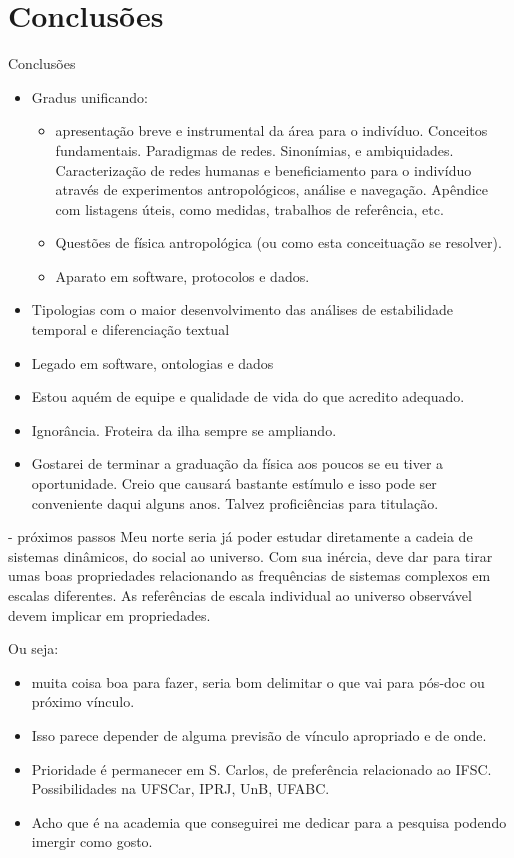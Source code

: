 \documentclass[10pt]{beamer}
\begin{document}
\section{Conclusões}
\begin{frame}{Conclusões}
\begin{itemize}
	\item Gradus unificando:
		\begin{itemize}
			\item  apresentação breve e instrumental da área para o indivíduo. Conceitos fundamentais. Paradigmas de redes. Sinonímias, e ambiquidades. Caracterização de redes humanas e beneficiamento para o indivíduo através de experimentos antropológicos, análise e navegação.
				Apêndice com listagens úteis, como medidas, trabalhos de referência, etc.
			\item Questões de física antropológica (ou como esta conceituação se resolver).
			\item Aparato em software, protocolos e dados.
		\end{itemize}
	\item Tipologias com o maior desenvolvimento das análises de estabilidade temporal e diferenciação textual
	\item Legado em software, ontologias e dados
	\item Estou aquém de equipe e qualidade de vida do que acredito adequado. 
	\item Ignorância. Froteira da ilha sempre se ampliando.
	\item Gostarei de terminar a graduação da física aos poucos se eu tiver a oportunidade. Creio que causará bastante estímulo e isso pode ser conveniente daqui alguns anos. Talvez proficiências para titulação.
\end{itemize}
\end{frame}

\begin{frame}{- próximos passos}
Meu norte seria já poder estudar diretamente a cadeia de sistemas dinâmicos, do social ao universo. Com sua inércia, deve dar para tirar umas boas propriedades relacionando as frequências de sistemas complexos em escalas diferentes. As referências de escala individual ao universo observável devem implicar em propriedades.

Ou seja:
	\begin{itemize}
		\item muita coisa boa para fazer, seria bom delimitar o que vai para pós-doc ou próximo vínculo.
		\item Isso parece depender de alguma previsão de vínculo apropriado e de onde.
		\item Prioridade é permanecer em S. Carlos, de preferência relacionado ao IFSC. Possibilidades na UFSCar, IPRJ, UnB, UFABC.
		\item Acho que é na academia que conseguirei me dedicar para a pesquisa podendo imergir como gosto.
	\end{itemize}
\end{frame}
\end{document}
